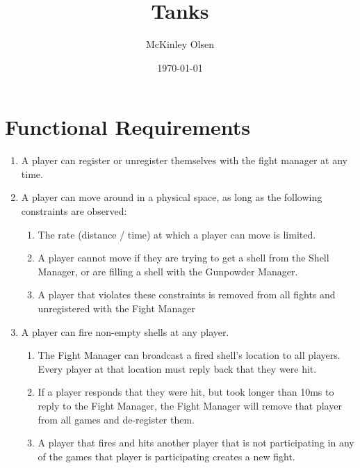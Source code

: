 \documentclass[12pt]{article}
\begin{document}
\begin{titlepage}
\title{Tanks}
\author{McKinley Olsen}
\date{\today}
\maketitle
\end{titlepage}

\newpage
\tableofcontents
\newpage

\section{Functional Requirements}

\begin{enumerate}

	\item{A player can register or unregister themselves with the fight manager at any time.}
	
	\item{A player can move around in a physical space, as long as the following constraints are observed:}
	\begin{enumerate}
		\item{The rate (distance / time) at which a player can move is limited.}
		\item{A player cannot move if they are trying to get a shell from the Shell Manager, or are filling a shell with the Gunpowder Manager.}
		\item{A player that violates these constraints is removed from all fights and unregistered with the Fight Manager}
	\end{enumerate}
	
	\item{A player can fire non-empty shells at any player.}
	\begin{enumerate}
		\item{The Fight Manager can broadcast a fired shell's location to all players. Every player at that location must reply back that they were hit.}
		\item{If a player responds that they were hit, but took longer than 10ms to reply to the Fight Manager, the Fight Manager will remove that player from all games and de-register them.}
		\item{A player that fires and hits another player that is not participating in any of the games that player is participating creates a new fight. }
	\end{enumerate}
	

\end{enumerate}
\end{document}
